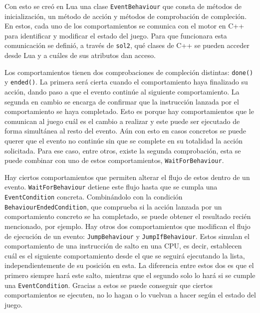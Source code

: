 \medskip

Con esto se creó en Lua una clase \texttt{EventBehaviour} que consta de métodos de inicialización, un método de acción y métodos de comprobación de compleción. En estos, cada uno de los comportamientos se comunica con el motor en C++ para identificar y modificar el estado del juego. Para que funcionara esta comunicación se definió, a través de \texttt{sol2}, qué clases de C++ se pueden acceder desde Lua y a cuáles de sus atributos dan acceso.

\medskip

Los comportamientos tienen dos comprobaciones de compleción distintas: \texttt{done()} y \texttt{ended()}. La primera será cierta cuando el comportamiento haya finalizado su acción, dando paso a que el evento continúe al siguiente comportamiento. La segunda en cambio se encarga de confirmar que la instrucción lanzada por el comportamiento se haya completado. Esto es porque hay comportamientos que le comunican al juego cuál es el cambio a realizar y este puede ser ejecutado de forma simultánea al resto del evento. Aún con esto en casos concretos se puede querer que el evento no continúe sin que se complete en su totalidad la acción solicitada. Para ese caso, entre otros, existe la segunda comprobación, esta se puede combinar con uno de estos comportamientos, \texttt{WaitForBehaviour}.

\medskip

Hay ciertos comportamientos que permiten alterar el flujo de estos dentro de un evento. \texttt{WaitForBehaviour} detiene este flujo hasta que se cumpla una \texttt{EventCondition} concreta. Combinándolo con la condición \texttt{BehaviourEndedCondition}, que comprueba si la acción lanzada por un comportamiento concreto se ha completado, se puede obtener el resultado recién mencionado, por ejemplo. Hay otros dos comportamientos que modifican el flujo de ejecución de un evento: \texttt{JumpBehaviour} y \texttt{JumpIfBehaviour}. Estos simulan el comportamiento de una instrucción de salto en una CPU, es decir, establecen cuál es el siguiente comportamiento desde el que se seguirá ejecutando la lista, independientemente de su posición en esta. La diferencia entre estos dos es que el primero siempre hará este salto, mientras que el segundo solo lo hará si se cumple una \texttt{EventCondition}. Gracias a estos se puede conseguir que ciertos comportamientos se ejecuten, no lo hagan o lo vuelvan a hacer según el estado del juego.

\smallskip

